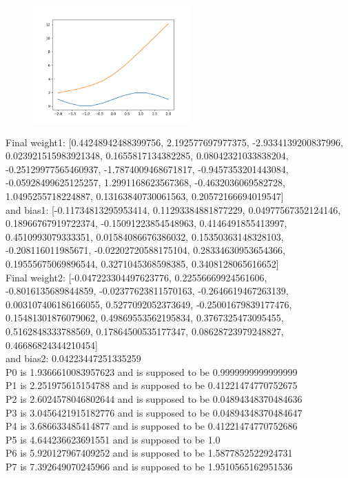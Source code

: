 \documentclass{article}
\begin{document}
\begin{figure}[htp]
    \centering
    \includegraphics[width=6cm]{photos/2_001.png}
    \label{fig:2}
\end{figure}
Final weight1: [0.44248942488399756, 2.192577697977375, -2.9334139200837996, 0.023921515983921348, 0.1655817134382285, 0.08042321033838204, -0.25129977565460937, -1.7874009468671817, -0.9457353201443084, -0.05928499625125257, 1.2991168623567368, -0.4632036069582728, 1.0495255718224887, 0.13163840730061563, 0.20572166694019547]\\ and bias1: [-0.11734813295953414, 0.11293384881877229, 0.04977567352124146, 0.18966767919722374, -0.15091223854548963, 0.4146491855413997, 0.4510993079333351, 0.01584086676386032, 0.15350363148328103, -0.208116011985671, -0.02202720588175104, 0.28334630953654366, 0.19555675069896544, 0.3271045368598385, 0.3408128065616652]\\
Final weight2: [-0.047223304497623776, 0.22556669924561606, -0.8016135689844859, -0.02377623811570163, -0.2646619467263139, 0.003107406186166055, 0.5277092052373649, -0.25001679839177476, 0.15481301876079062, 0.49869553562195834, 0.3767325473095455, 0.5162848333788569, 0.17864500535177347, 0.08628723979248827, 0.46686824344210454]\\ and bias2: 0.04223447251335259\\
P0 is 1.9366610083957623 and is supposed to be 0.9999999999999999\\
P1 is 2.251975615154788 and is supposed to be 0.41221474770752675\\
P2 is 2.6024578046802644 and is supposed to be 0.04894348370484636\\
P3 is 3.0456421915182776 and is supposed to be 0.04894348370484647\\
P4 is 3.686633485414877 and is supposed to be 0.41221474770752686\\
P5 is 4.644236623691551 and is supposed to be 1.0\\
P6 is 5.920127967409252 and is supposed to be 1.5877852522924731\\
P7 is 7.392649070245966 and is supposed to be 1.9510565162951536\\
\end{document}
